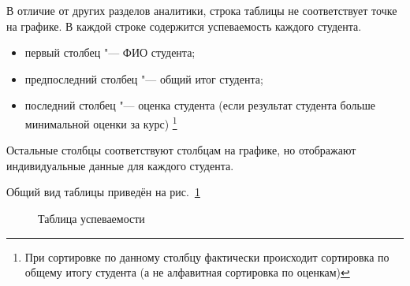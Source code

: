 В отличие от других разделов аналитики, строка таблицы не соответствует точке на графике. 
В каждой строке содержится успеваемость каждого студента.
\begin{itemize}
	\item первый столбец "--- ФИО студента;
	\item предпоследний столбец "--- общий итог студента;
	\item последний столбец "--- оценка студента (если результат студента больше минимальной оценки за курс)
	\footnote{При сортировке по данному столбцу фактически происходит сортировка по общему итогу 
	студента (а не алфавитная сортировка по оценкам)}
\end{itemize}
Остальные столбцы соответствуют столбцам на графике, но отображают индивидуальные данные для 
каждого студента.

Общий вид таблицы приведён на рис.~\ref{analytics:progress:table}
\begin{figure}[H]
	\caption{Таблица успеваемости}
	\label{analytics:progress:table}
\end{figure}
